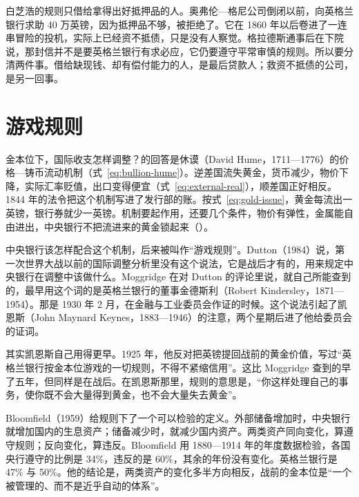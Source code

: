 \begin{pitfall}[最后贷款人就是去救快要倒闭的公司]
白芝浩的规则只借给拿得出好抵押品的人。奥弗伦—格尼公司倒闭以前，向英格兰银行求助 40 万英镑，因为抵押品不够，被拒绝了\cite{andreades1909}。它在 1860 年以后卷进了一连串冒险的投机，实际上已经资不抵债，只是没有人察觉\cite{andreades1909}。格拉德斯通事后在下院说，那封信并不是要英格兰银行有求必应，它仍要遵守平常审慎的规则\cite{hansard1866}。所以要分清两件事。借给缺现钱、却有偿付能力的人，是最后贷款人；救资不抵债的公司，是另一回事。
\end{pitfall}

\section{游戏规则}\label{sec:gold-rules}

金本位下，国际收支怎样调整？的回答是休谟（David Hume，1711—1776）的价格—铸币流动机制（式~\eqref{eq:bullion-hume}）。逆差国流失黄金，货币减少，物价下降，实际汇率贬值，出口变得便宜（式~\eqref{eq:external-real}），顺差国正好相反。1844 年的法令把这个机制写进了发行部的账。按式~\eqref{eq:gold-issue}，黄金每流出一英镑，银行券就少一英镑。机制要起作用，还要几个条件，物价有弹性，金属能自由进出，中央银行不把流进来的黄金锁起来（）。

中央银行该怎样配合这个机制，后来被叫作“游戏规则”。Dutton（1984）说，第一次世界大战以前的国际调整分析里没有这个说法，它是战后才有的，用来规定中央银行在调整中该做什么\cite{dutton1984}。Moggridge 在对 Dutton 的评论里说，就自己所能查到的，最早用这个词的是英格兰银行的董事金德斯利（Robert Kindersley，1871—1954）。那是 1930 年 2 月，在金融与工业委员会作证的时候\cite{dutton1984}。这个说法引起了凯恩斯（John Maynard Keynes，1883—1946）的注意，两个星期后进了他给委员会的证词\cite{dutton1984}。

其实凯恩斯自己用得更早。1925 年，他反对把英镑提回战前的黄金价值，写过“英格兰银行按金本位游戏的一切规则，不得不紧缩信用”\cite{keynes1925}。这比 Moggridge 查到的早了五年，但同样是在战后。在凯恩斯那里，规则的意思是，“你这样处理自己的事务，使你既不会大量得到黄金，也不会大量失去黄金”\cite{dutton1984}。

Bloomfield（1959）给规则下了一个可以检验的定义。外部储备增加时，中央银行就增加国内的生息资产；储备减少时，就减少国内资产\cite{dutton1984}。两类资产同向变化，算遵守规则；反向变化，算违反。Bloomfield 用 1880—1914 年的年度数据检验，各国央行遵守的比例是 34\%，违反的是 60\%，其余的年份没有变化\cite{dutton1984,bloomfield1959}。英格兰银行是 47\% 与 50\%\cite{dutton1984}。他的结论是，两类资产的变化多半方向相反，战前的金本位是“一个被管理的、而不是近乎自动的体系”\cite{bordo1984}。

